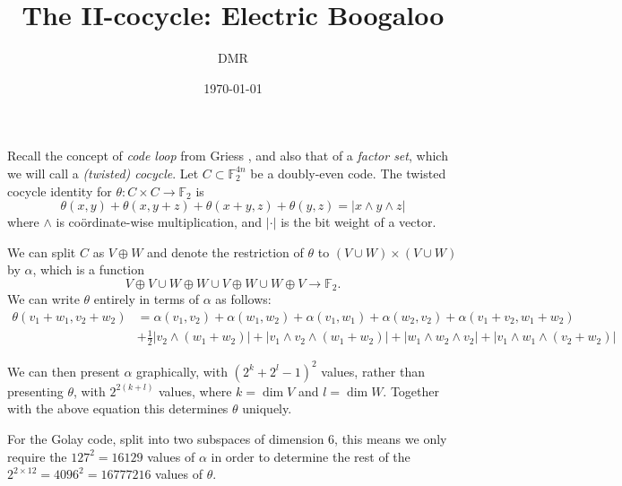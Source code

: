 \documentclass[a4paper,debug]{tufte-handout}
\title{The II-cocycle: Electric Boogaloo}
\date{\today}
\author{DMR}
\newcommand{\F}{\mathbb{F}}
\begin{document}
\maketitle

\noindent 
Recall the concept of \emph{code loop} from Griess\cite{Griess}
, and also that of a \emph{factor set}, 
which we will call a \emph{(twisted) cocycle}. 
Let $C \subset \F_2^{4n}$ be a doubly-even code.
The twisted cocycle identity for $\theta\colon C\times C \to \F_2$ is
\[
	\theta(x,y) + \theta(x,y+z) + \theta(x+y,z) + \theta(y,z) = |x\wedge y \wedge z|
\]
where $\wedge$ is co\"ordinate-wise multiplication, and $|\cdot|$ is the bit weight of a vector.

We can split $C$ as $V\oplus W$ and denote the restriction of $\theta$ to $(V\cup W)\times (V \cup W)$ by $\alpha$, which is a function
\[
	V\oplus V \cup W\oplus W \cup V\oplus W \cup W\oplus V \to \F_2.
\]
We can write $\theta$ entirely in terms of $\alpha$ as follows:
\begin{align*}
	\theta(v_1+w_1,v_2+w_2)	& = \alpha(v_1,v_2)  + \alpha(w_1,w_2) + \alpha(v_1,w_1) + \alpha(w_2,v_2) + \alpha(v_1+v_2,w_1+w_2)\\
							& + \frac12|v_2\wedge(w_1+w_2)| + |v_1\wedge v_2 \wedge (w_1+w_2)| + |w_1\wedge w_2 \wedge v_2| + |v_1\wedge w_1 \wedge (v_2 + w_2)|
\end{align*}

We can then present $\alpha$ graphically, with $(2^k + 2^l - 1)^2$ values, rather than presenting $\theta$, with $2^{2(k+l)}$ values, where $k=\dim V$ and $l=\dim W$. Together with the above equation this determines $\theta$ uniquely. 

For the Golay code, split into two subspaces of dimension 6, this means we only require the $127^2 = 16129$ values of $\alpha$ in order to determine the rest of the $2^{2\times 12} = 4096^2 = 16777216$ values of $\theta$.

\end{document}
